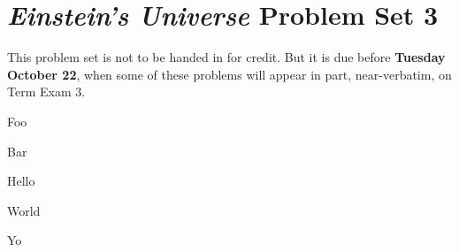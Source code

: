 \documentclass[12pt, letterpaper]{article}
\begin{document}
\section*{\textsl{Einstein's Universe} Problem Set 3}

This problem set is not to be handed in for credit. But it is due
before \textbf{Tuesday October 22}, when some of these problems
will appear in part, near-verbatim, on Term Exam 3.

\begin{problem}
Foo
\end{problem}

\begin{problem}
Bar
\end{problem}

\begin{problem}
Hello
\end{problem}

\begin{problem}
World
\end{problem}

\begin{problem}
Yo
\end{problem}
\end{document}
